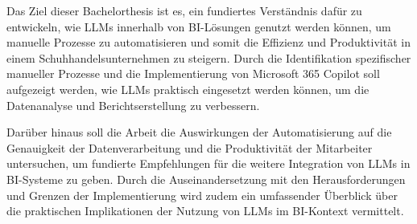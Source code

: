 Das Ziel dieser Bachelorthesis ist es, ein fundiertes Verständnis dafür zu entwickeln, wie LLMs innerhalb von BI-Lösungen genutzt werden können, um manuelle Prozesse zu automatisieren und somit die Effizienz und Produktivität in einem Schuhhandelsunternehmen zu steigern. Durch die Identifikation spezifischer manueller Prozesse und die Implementierung von Microsoft 365 Copilot soll aufgezeigt werden, wie LLMs praktisch eingesetzt werden können, um die Datenanalyse und Berichtserstellung zu verbessern.

Darüber hinaus soll die Arbeit die Auswirkungen der Automatisierung auf die Genauigkeit der Datenverarbeitung und die Produktivität der Mitarbeiter untersuchen, um fundierte Empfehlungen für die weitere Integration von LLMs in BI-Systeme zu geben. Durch die Auseinandersetzung mit den Herausforderungen und Grenzen der Implementierung wird zudem ein umfassender Überblick über die praktischen Implikationen der Nutzung von LLMs im BI-Kontext vermittelt.

\clearpage